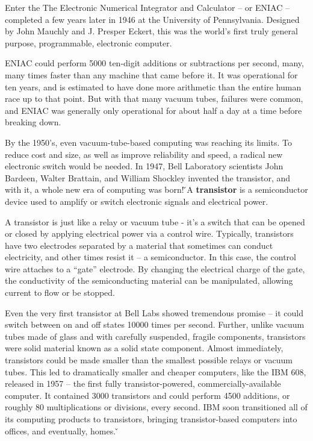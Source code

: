Enter the The Electronic Numerical Integrator and Calculator – or ENIAC – completed a few years later in 1946 at the
University of Pennsylvania. Designed by John Mauchly and J. Presper Eckert, this was the world's first truly general
purpose, programmable, electronic computer.


ENIAC could perform 5000 ten-digit additions or subtractions per second, many, many times faster than any machine
that came before it. It was operational for ten years, and is estimated to have done more arithmetic than the entire
human race up to that point. But with that many vacuum tubes, failures were common, and ENIAC was generally only
operational for about half a day at a time before breaking down.

By the 1950's, even vacuum-tube-based computing was reaching its limits. To reduce cost and size, as well as improve
reliability and speed, a radical new electronic switch would be needed. In 1947, Bell Laboratory scientists John
Bardeen, Walter Brattain, and William Shockley invented the transistor, and with it, a whole new era of computing was
born! \v

\bd[Transistor]
A \textbf{transistor} is a semiconductor device used to amplify or switch electronic signals and electrical power.
\ed

A transistor is just like a relay or vacuum tube - it's a switch that can be opened or closed by applying electrical
power via a control wire. Typically, transistors have two electrodes separated by a material that sometimes can
conduct electricity, and other times resist it – a semiconductor. In this case, the control wire attaches to a
``gate'' electrode. By changing the electrical charge of the gate, the conductivity of the semiconducting material
can be manipulated, allowing current to flow or be stopped.


Even the very first transistor at Bell Labs showed tremendous promise – it could switch between on and off states 10000
times per second. Further, unlike vacuum tubes made of glass and with carefully suspended, fragile components,
transistors were solid material known as a solid state component. Almost immediately, transistors could be made
smaller than the smallest possible relays or vacuum tubes. This led to dramatically smaller and cheaper computers,
like the IBM 608, released in 1957 – the first fully transistor-powered, commercially-available computer. It
contained 3000 transistors and could perform 4500 additions, or roughly 80 multiplications or divisions, every
second. IBM soon transitioned all of its computing products to transistors, bringing transistor-based computers into
offices, and eventually, homes. \v

